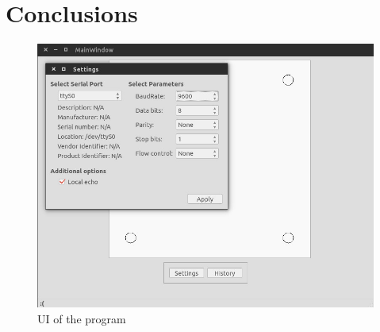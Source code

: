 	\section{Conclusions} %
	\label{sec:pc_conclusions}
	

		\begin{figure}[hb!]
			\begin{center}
				\includegraphics[width=.8\textwidth]{figures/UI}
			\end{center}
			\caption{UI of the program}
			\label{fig:ui}
		\end{figure}
